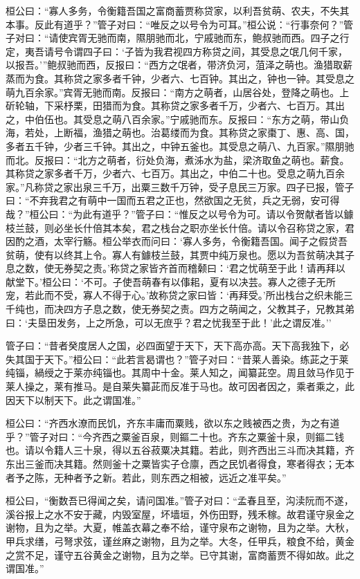 \documentclass[]{article}
\begin{document}
桓公曰：``寡人多务，令衡籍吾国之富商蓄贾称贷家，以利吾贫萌、农夫，不失其本事。反此有道乎？''管子对曰：``唯反之以号令为可耳。''桓公说：``行事奈何？''管子对曰：``请使宾胥无驰而南，隰朋驰而北，宁戚驰而东，鲍叔驰而西。四子之行定，夷吾请号令谓四子曰：`子皆为我君视四方称贷之间，其受息之氓几何千家，以报吾。'''鲍叔驰而西，反报曰：``西方之氓者，带济负河，菹泽之萌也。渔猎取薪蒸而为食。其称贷之家多者千钟，少者六、七百钟。其出之，钟也一钟。其受息之萌九百余家。''宾胥无驰而南。反报曰：``南方之萌者，山居谷处，登降之萌也。上斫轮轴，下采杼栗，田猎而为食。其称贷之家多者千万，少者六、七百万。其出之，中伯伍也。其受息之萌八百余家。''宁戚驰而东。反报曰：``东方之萌，带山负海，若处，上断福，渔猎之萌也。治葛缕而为食。其称贷之家棗丁、惠、高、国，多者五千钟，少者三千钟。其出之，中钟五釜也。其受息之萌八、九百家。''隰朋驰而北。反报曰：``北方之萌者，衍处负海，煮泲水为盐，梁济取鱼之萌也。薪食。其称贷之家多者千万，少者六、七百万。其出之，中伯二十也。受息之萌九百余家。''凡称贷之家出泉三千万，出粟三数千万钟，受子息民三万家。四子已报，管子曰：``不弃我君之有萌中一国而五君之正也，然欲国之无贫，兵之无弱，安可得哉？''桓公曰：``为此有道乎？''管子曰：``惟反之以号令为可。请以令贺献者皆以鐻枝兰鼓，则必坐长什倍其本矣，君之栈台之职亦坐长什倍。请以令召称贷之家，君因酌之酒，太宰行觞。桓公举衣而问曰：`寡人多务，令衡籍吾国。闻子之假贷吾贫萌，使有以终其上令。寡人有鐻枝兰鼓，其贾中纯万泉也。愿以为吾贫萌决其子息之数，使无券契之责。'称贷之家皆齐首而稽颡曰：`君之忧萌至于此！请再拜以献堂下。'桓公曰：`不可。子使吾萌春有以倳耜，夏有以决芸。寡人之德子无所宠，若此而不受，寡人不得于心。'故称贷之家曰皆：`再拜受。'所出栈台之织未能三千纯也，而决四方子息之数，使无券契之责。四方之萌闻之，父教其子，兄教其弟曰：`夫垦田发务，上之所急，可以无庶乎？君之忧我至于此！'此之谓反准。''

管子曰：``昔者癸度居人之国，必四面望于天下，天下高亦高。天下高我独下，必失其国于天下。''桓公曰：``此若言曷谓也？''管子对曰：``昔莱人善染。练茈之于莱纯锱，緺绶之于莱亦纯锱也。其周中十金。莱人知之，闻纂茈空。周且敛马作见于莱人操之，莱有推马。是自莱失纂茈而反准于马也。故可因者因之，乘者乘之，此因天下以制天下。此之谓国准。''

桓公曰：``齐西水潦而民饥，齐东丰庸而粟贱，欲以东之贱被西之贵，为之有道乎？''管子对曰：``今齐西之粟釜百泉，则鏂二十也。齐东之粟釜十泉，则鏂二钱也。请以令籍人三十泉，得以五谷菽粟决其籍。若此，则齐西出三斗而决其籍，齐东出三釜而决其籍。然则釜十之粟皆实子仓廪，西之民饥者得食，寒者得衣；无本者予之陈，无种者予之新。若此，则东西之相被，远近之准平矣。''

桓公曰，``衡数吾已得闻之矣，请问国准。''管子对曰：``孟春且至，沟渎阮而不遂，溪谷报上之水不安于藏，内毁室屋，坏墙垣，外伤田野，残禾稼。故君谨守泉金之谢物，且为之举。大夏，帷盖衣幕之奉不给，谨守泉布之谢物，且为之举。大秋，甲兵求缮，弓弩求弦，谨丝麻之谢物，且为之举。大冬，任甲兵，粮食不给，黄金之赏不足，谨守五谷黄金之谢物，且为之举。已守其谢，富商蓄贾不得如故。此之谓国准。''
\end{document}
